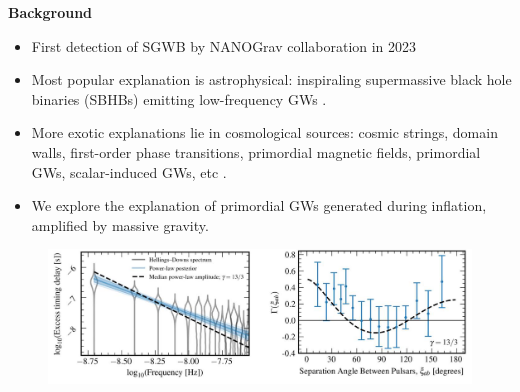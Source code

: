\documentclass{beamer}                             %
\newcommand{\blocktitle}[1]{{\Large \textbf{#1}}}
\begin{document}
\begin{frame}[t]
\begin{columns}[T]
\begin{column}{0.30\textwidth}
  \begin{tcolorbox}
    \blocktitle{Background}
    \begin{itemize}
        \item First detection of SGWB by NANOGrav collaboration in 2023 \cite{Agazie:2023}
        \item Most popular explanation is astrophysical: inspiraling supermassive black hole binaries (SBHBs) emitting low-frequency GWs \cite{Burke-Spolaor:2018bvk}.
        \item More exotic explanations lie in cosmological sources: cosmic strings, domain walls, first-order phase transitions, primordial magnetic fields, primordial GWs, scalar-induced GWs, etc \cite{Afzal:2023}.  
        \item We explore the explanation of primordial GWs generated during inflation, amplified by massive gravity.
    \end{itemize}
    \begin{figure}[t]
      \centering
      \includegraphics[width=\linewidth]{ng15.png}  
      \label{fig:ng15}
    \end{figure}
  \end{tcolorbox}


\end{column}
\end{columns}
\end{frame}
\end{document}
